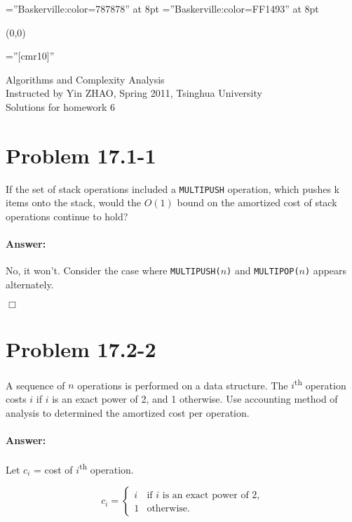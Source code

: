 \documentclass[a4paper,10pt]{article}
\newcommand{\problem}[1]{\section*{Problem #1}}
\newcommand{\answer}{\paragraph{Answer:}}
\newcommand{\qed}{\hfill \ensuremath{\Box}}
\begin{document}
\font\wm=''Baskerville:color=787878'' at 8pt
\font\wmtoday=''Baskerville:color=FF1493'' at 8pt
{\wm 
	\begin{textblock}{1}(0,0)
	\end{textblock}
}

\pagestyle{empty} %

\font\fb=''[cmr10]'' %

\par{\centering
  {\Large Algorithms and Complexity Analysis}
  \\\vspace{0.5em}
  { Instructed by Yin ZHAO, Spring 2011, Tsinghua University}
  \\\vspace{1.5em}
	{\Huge Solutions for homework 6\vspace{1em}
	}\bigskip\par}


\problem{17.1-1}

If the set of stack operations included a \texttt{MULTIPUSH} operation, which pushes k items onto the stack,
would the $O(1)$ bound on the amortized cost of stack operations continue to hold?

\answer

No, it won't. Consider the case where \texttt{MULTIPUSH($n$)} and \texttt{MULTIPOP($n$)} appears alternately.

\qed

\problem{17.2-2}

A sequence of $n$ operations is performed on a data structure. The $i$\textsuperscript{th} operation costs $i$ if $i$ is an exact power of 2, and 1 otherwise. 
Use accounting method of analysis to determined the amortized cost per operation.


\answer

Let $c_i$ = cost of $i$\textsuperscript{th} operation.

\begin{equation*}
c_i = \left\{
  \begin{array}{ll}
    i     & \text{if $i$ is an exact power of $2$,}\\
	1 & \text{otherwise.}
  \end{array}
\right.
\end{equation*}
\end{document}
